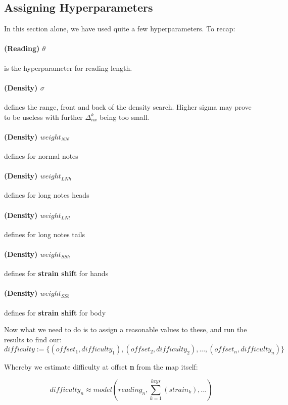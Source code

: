 \subsection{Assigning Hyperparameters}

In this section alone, we have used quite a few hyperparameters. To recap:

\paragraph{(Reading) $\theta$} is the hyperparameter for reading length.
\paragraph{(Density) $\sigma$} defines the range, front and back of the density search. Higher sigma may prove to be useless with further $\Delta_{nx}^k$ being too small.

\paragraph{(Density) $weight_{NN}$} defines for normal notes
\paragraph{(Density) $weight_{LNh}$} defines for long notes heads
\paragraph{(Density) $weight_{LNt}$} defines for long notes tails
\paragraph{(Density) $weight_{SSh}$} defines for \textbf{strain shift} for hands
\paragraph{(Density) $weight_{SSb}$} defines for \textbf{strain shift} for body 

Now what we need to do is to assign a reasonable values to these, and run the results to find our:
$$ difficulty := \lbrace(offset_1, difficulty_1), (offset_2, difficulty_2), ..., (offset_n, difficulty_n)\rbrace $$

Whereby we estimate difficulty at offset \textbf{n} from the map itself:

$$ difficulty_n \approx model \left( reading_n, \sum_{k=1}^{keys} \left(strain_k \right), ... \right)$$

